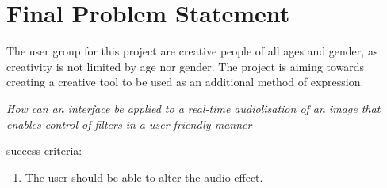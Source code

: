 \chapter{Final Problem Statement}\label{ch:finalproblem}

The user group for this project are creative people of all ages and gender, as creativity is not limited by age nor gender. 
The project is aiming towards creating a creative tool to be used as an additional method of expression. 


\textit{How can an interface be applied to a real-time audiolisation of an image that enables control of filters in a user-friendly manner}

success criteria:
\begin{enumerate}
\item The user should be able to alter the audio effect.
\end{enumerate}

